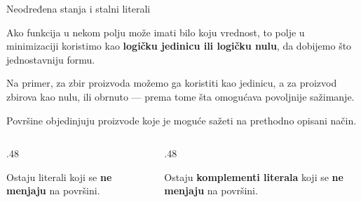 \begin{frame}[label=02-s042]{Neodređena stanja i stalni literali}
\setlength{\parskip}{0pt}
\par\vspace{1mm}
Ako funkcija u nekom polju može imati bilo koju vrednost, to polje u minimizaciji koristimo kao \textbf{logičku jedinicu ili logičku nulu}, da dobijemo što jednostavniju formu.
\par\vspace{1mm}
Na primer, za zbir proizvoda možemo ga koristiti kao jedinicu, a za proizvod zbirova kao nulu, ili obrnuto --- prema tome šta omogućava povoljnije sažimanje.
\par\vspace{3mm}
Površine objedinjuju proizvode koje je moguće sažeti na prethodno opisani način.
\par\vspace{2mm}
\begin{columns}[T,onlytextwidth]
\begin{column}{.48\textwidth}
\par\vspace{1mm}
Ostaju literali koji se \alert{\textbf{ne menjaju}} na površini.
\end{column}
\begin{column}{.48\textwidth}
\par\vspace{1mm}
Ostaju \alert{\textbf{komplementi literala}} koji se \alert{\textbf{ne menjaju}} na površini.
\end{column}
\end{columns}
\par\vspace{3mm}
\end{frame}
